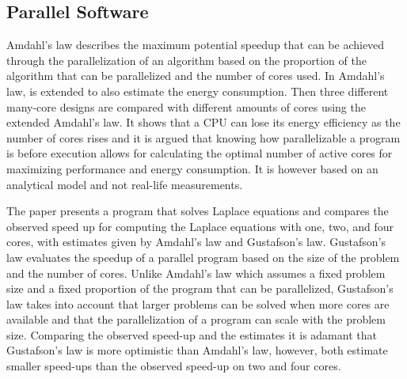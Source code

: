 \subsection{Parallel Software}

Amdahl's law describes the maximum potential speedup that can be achieved through the parallelization of an algorithm based on the proportion of the algorithm that can be parallelized and the number of cores used.\cite{amdahl1967validity} In \cite{woo2008extending} Amdahl's law, is extended to also estimate the energy consumption.  Then three different many-core designs are compared with different amounts of cores using the extended Amdahl's law. It shows that a CPU can lose its energy efficiency as the number of cores rises and it is argued that knowing how parallelizable a program is before execution allows for calculating the optimal number of active cores for maximizing performance and energy consumption. It is however based on an analytical model and not real-life measurements.\cite{woo2008extending}

The paper \cite{prinslow2011overview} presents a program that solves Laplace equations and compares the observed speed up for computing the Laplace equations with one, two, and four cores, with estimates given by Amdahl's law and Gustafson's law.  Gustafson's law evaluates the speedup of a parallel program based on the size of the problem and the number of cores. Unlike Amdahl's law which assumes a fixed problem size and a fixed proportion of the program that can be parallelized, Gustafson's law takes into account that larger problems can be solved when more cores are available and that the parallelization of a program can scale with the problem size. Comparing the observed speed-up and the estimates it is adamant that Gustafson's law is more optimistic than Amdahl's law, however, both estimate smaller speed-ups than the observed speed-up on two and four cores. \cite{prinslow2011overview}


